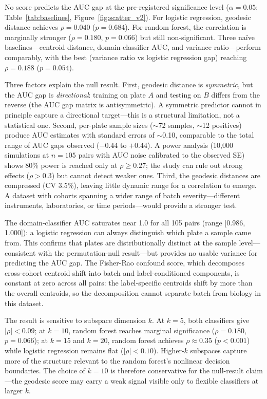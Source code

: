 \documentclass{article}
\begin{document}
No score predicts the AUC gap at the pre-registered significance level ($\alpha = 0.05$; Table~\ref{tab:baselines}, Figure~\ref{fig:scatter_v2}). For logistic regression, geodesic distance achieves $\rho = 0.040$ ($p = 0.684$). For random forest, the correlation is marginally stronger ($\rho = 0.180$, $p = 0.066$) but still non-significant. Three na\"{i}ve baselines---centroid distance, domain-classifier AUC, and variance ratio---perform comparably, with the best (variance ratio vs logistic regression gap) reaching $\rho = 0.188$ ($p = 0.054$).

Three factors explain the null result. First, geodesic distance is \emph{symmetric}, but the AUC gap is \emph{directional}: training on plate $A$ and testing on $B$ differs from the reverse (the AUC gap matrix is antisymmetric). A symmetric predictor cannot in principle capture a directional target---this is a structural limitation, not a statistical one. Second, per-plate sample sizes ($\sim$72 samples, $\sim$12 positives) produce AUC estimates with standard errors of $\sim$0.10, comparable to the total range of AUC gaps observed ($-0.44$ to $+0.44$). A power analysis (10{,}000 simulations at $n = 105$ pairs with AUC noise calibrated to the observed SE) shows 80\% power is reached only at $\rho \geq 0.27$; the study can rule out strong effects ($\rho > 0.3$) but cannot detect weaker ones. Third, the geodesic distances are compressed (CV 3.5\%), leaving little dynamic range for a correlation to emerge. A dataset with cohorts spanning a wider range of batch severity---different instruments, laboratories, or time periods---would provide a stronger test.

The domain-classifier AUC saturates near 1.0 for all 105 pairs (range [0.986, 1.000]): a logistic regression can always distinguish which plate a sample came from. This confirms that plates are distributionally distinct at the sample level---consistent with the permutation-null result---but provides no usable variance for predicting the AUC gap. The Fisher-Rao confound score, which decomposes cross-cohort centroid shift into batch and label-conditioned components, is constant at zero across all pairs: the label-specific centroids shift by more than the overall centroids, so the decomposition cannot separate batch from biology in this dataset.

The result is sensitive to subspace dimension $k$. At $k = 5$, both classifiers give $|\rho| < 0.09$; at $k = 10$, random forest reaches marginal significance ($\rho = 0.180$, $p = 0.066$); at $k = 15$ and $k = 20$, random forest achieves $\rho \approx 0.35$ ($p < 0.001$) while logistic regression remains flat ($|\rho| < 0.10$). Higher-$k$ subspaces capture more of the structure relevant to the random forest's nonlinear decision boundaries. The choice of $k = 10$ is therefore conservative for the null-result claim---the geodesic score may carry a weak signal visible only to flexible classifiers at larger $k$.
\end{document}
